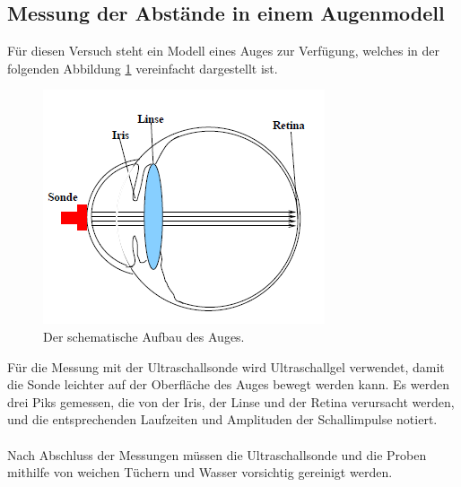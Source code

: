 \subsection{Messung der Abstände in einem Augenmodell}

    Für diesen Versuch steht ein Modell eines Auges zur Verfügung,
    welches in der folgenden Abbildung \ref{fig:augenmodell} vereinfacht dargestellt ist.

    \begin{figure}[H]
        \centering
        \includegraphics[scale=0.7]{augenmodell.PNG}
        \caption{Der schematische Aufbau des Auges.}
        \label{fig:augenmodell}
    \end{figure}

    Für die Messung mit der Ultraschallsonde wird Ultraschallgel verwendet,
    damit die Sonde leichter auf der Oberfläche des Auges bewegt werden kann.
    Es werden drei Piks gemessen,
    die von der Iris, der Linse und der Retina verursacht werden,
    und die entsprechenden Laufzeiten und Amplituden der Schallimpulse notiert.\\
    \\
    Nach Abschluss der Messungen müssen die Ultraschallsonde und die Proben mithilfe von weichen Tüchern und Wasser vorsichtig gereinigt werden.